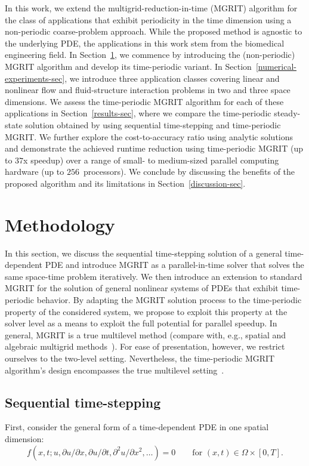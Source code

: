\documentclass[3p]{elsarticle}
\begin{document}
In this work, we extend the multigrid-reduction-in-time (MGRIT) algorithm
for the class of applications that exhibit periodicity in the time dimension
using a non-periodic coarse-problem approach.
While the proposed method is agnostic to the underlying PDE,
the applications in this work stem from the biomedical engineering field.
In Section~\ref{methodology-sec},
we commence by introducing the (non-periodic) MGRIT algorithm
and develop its time-periodic variant.
In Section~\ref{numerical-experiments-sec},
we introduce three application classes covering linear and nonlinear flow and fluid-structure interaction problems
in two and three space dimensions.
We assess the time-periodic MGRIT algorithm for each of these applications in Section~\ref{results-sec},
where we compare the time-periodic steady-state solution
obtained by using sequential time-stepping and time-periodic MGRIT.
We further explore the cost-to-accuracy ratio using analytic solutions
and demonstrate the achieved runtime reduction using time-periodic MGRIT
(up to $37$x speedup)
over a range of small- to medium-sized parallel computing hardware
(up to $256$~processors).
We conclude by discussing the benefits of the proposed algorithm and its limitations in Section~\ref{discussion-sec}.
\section{Methodology} \label{methodology-sec}
In this section, we discuss the sequential time-stepping solution of a general time-dependent PDE
and introduce MGRIT as a parallel-in-time solver that solves the same space-time problem iteratively.
We then introduce an extension to standard MGRIT
for the solution of general nonlinear systems of PDEs that exhibit time-periodic behavior.
By adapting the MGRIT solution process to the time-periodic property of the considered system,
we propose to exploit this property at the solver level
as a means to exploit the full potential for parallel speedup.
In general, MGRIT is a true multilevel method (compare with, e.g.,
spatial and algebraic multigrid methods~\cite{BrandtMccormickRuge1985,BriggsHensonMccormick2000,HackbuschTrottenberg2006}).
For ease of presentation, however, we restrict ourselves to the two-level setting.
Nevertheless, the time-periodic MGRIT algorithm's design encompasses
the true multilevel setting~\cite{Hessenthaler2020_PhD}.
\subsection{Sequential time-stepping}
\label{mgrit-sequential-time-stepping-sec}
First, consider the general form of a time-dependent PDE in one spatial dimension:
\begin{equation}
    f (x, t; u, \partial u / \partial x, \partial u / \partial t, \partial^2 u / \partial x^2, \ldots) = 0
    \qquad \text{for } (x, t) \in \Omega \times [0, T].
    \label{general-form-pde-eqn}
\end{equation}
\end{document}
